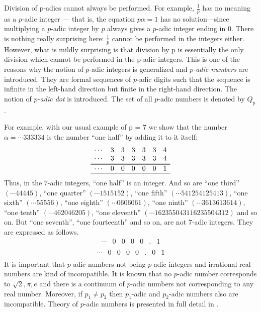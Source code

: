 \documentclass{llncs}
\begin{document}
Division of p-adics  cannot always be
performed. For example, $\frac{1}{p}$ has no meaning as a $p$-adic integer — that is, the
equation $p\alpha  = 1$  has no solution—since multiplying a $p$-adic integer by $p$ always
gives a $p$-adic integer ending in $0$. There is nothing really surprising here: $\frac{1}{p}$
cannot be performed in the integers either.
However, what is mildly surprising is that division by p is essentially the only
division which cannot be performed in the p-adic integers.  This is one of the reasons why the notion of
$p$-adic integers is generalized and {\em $p$-adic numbers} are introduced. They are formal sequences 
of $p$-adic digits such that the sequence is infinite in the left-hand direction but finite in the
right-hand direction. The notion of {\em $p$-adic dot} is introduced. The set of all $p$-adic numbers is denoted by 
$Q_p$.


For example, with our usual example of p = 7 we show that the number
$\alpha  = \cdots 333334$  is the number “one half” by adding it to it itself:   
$$
\begin{array}{rrrrrrrr|}
\cdots &3&3&3&3&3&4\\
\cdots & 3& 3 &3& 3 & 3& 4\\
\hline
\hline
\cdots &0& 0& 0& 0& 0 & 1 \\
\hline
\end{array}
$$
Thus, in the 7-adic integers, “one half” is an integer. And so are “one third”
$(\cdots 44445)$, “one quarter” $(\cdots 1515152)$, “one fifth” $(\cdots 541254125413)$, “one
sixth” $(\cdots 55556)$, “one eighth” $(\cdots 0606061)$, “one ninth” $(\cdots 3613613614)$, “one
tenth” $(\cdots  462046205)$, “one eleventh” $(\cdots 162355043116235504312)$ and so on.
But “one seventh”, “one fourteenth” and so on, are not 7-adic integers. They are expressed as follows.
$$
\begin{array}{rrrrrrrr|}
\cdots &0&0&0&0&.&1\\
\end{array}
$$
$$
\begin{array}{rrrrrrrrr|}
\cdots &0&0&0&0&.&0&1\\
\end{array}
$$
It is important that $p$-adic numbers not being $p$-adic integers and irrational real numbers are kind of incompatible.
It is known that no $p$-adic number corresponds to $\sqrt{2}, \pi , e$ and there is a continuum of $p$-adic numbers
not corresponding to any real number. Moreover, if $p_1 \neq p_2$ then $p_1$-adic and $p_2$-adic numbers also are
incompatible.
Theory of $p$-adic numbers is presented in full detail in \cite{G83,K84}.
\end{document}
